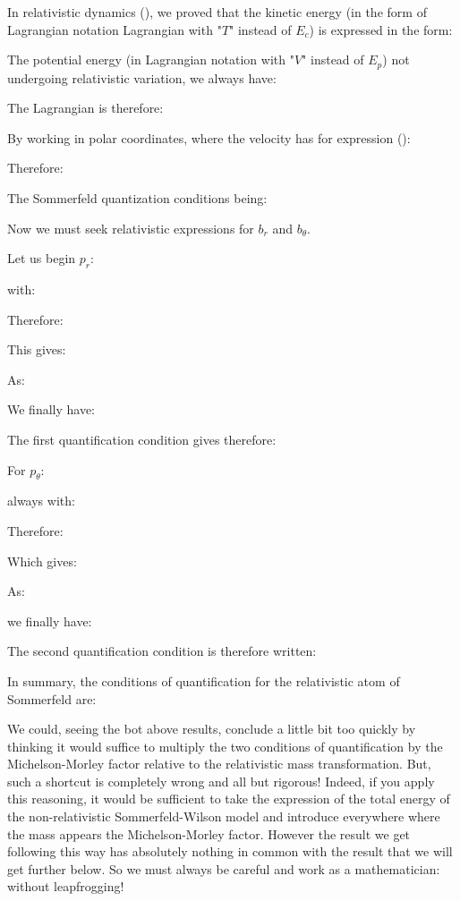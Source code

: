 	In relativistic dynamics (), we proved that the kinetic energy (in the form of Lagrangian notation Lagrangian with "$T$" instead of $E_c$) is expressed in the form:
	
	The potential energy (in Lagrangian notation with "$V$" instead of $E_p$) not undergoing relativistic variation, we always have:
	
	The Lagrangian is therefore:
	
	By working in polar coordinates, where the velocity has for expression ():
	
	Therefore:
	
	The Sommerfeld quantization conditions being:
	
	Now we must seek relativistic expressions for $b_r$ and $b_\theta$.
	
	Let us begin $p_r$:
	
	with:
	
	Therefore:
	
	This gives:
	
	As:
	
	We finally have:
	
	The first quantification condition gives therefore:
	
	For $p_\theta$:
	
	always with:
	
	Therefore:
	
	Which gives:
	
	As:
	
	we finally have:
	
	The second quantification condition\label{second quantification condition} is therefore written:
	
	In summary, the conditions of quantification for the relativistic atom of Sommerfeld are:
	
	We could, seeing the bot above results, conclude a little bit too quickly by thinking it would suffice to multiply the two conditions of quantification by the Michelson-Morley factor relative to the relativistic mass transformation. But, such a shortcut is completely wrong and all but rigorous! Indeed, if you apply this reasoning, it would be sufficient to take the expression of the total energy of the non-relativistic Sommerfeld-Wilson model and introduce everywhere where the mass appears the Michelson-Morley factor. However the result we get following this way has absolutely nothing in common with the result that we will get further below. So we must always be careful and work as a mathematician: without leapfrogging!
	
